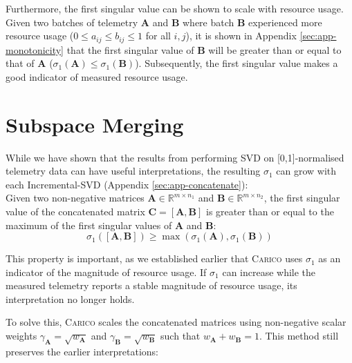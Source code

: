 Furthermore, the first singular value can be shown to scale with resource usage.
Given two batches of telemetry $\mathbf{A}$ and $\mathbf{B}$ where batch
$\mathbf{B}$ experienced more resource usage ($0 \leq a_{ij} \leq b_{ij} \leq 1$
for all $i,j$), it is shown in Appendix \ref{sec:app-monotonicity} that the
first singular value of $\mathbf{B}$ will be greater than or equal to that of
$\mathbf{A}$ ($\sigma_1(\mathbf{A}) \leq \sigma_1(\mathbf{B})$). Subsequently,
the first singular value makes a good indicator of measured resource usage.

\section{Subspace Merging}
\label{sec:local-merge}
While we have shown that the results from performing SVD on [0,1]-normalised
telemetry data can have useful interpretations, the resulting $\sigma_1$ can
grow with each Incremental-SVD (Appendix \ref{sec:app-concatenate}):\\
Given two non-negative matrices $\mathbf{A} \in \mathbb{R}^{m \times n_1}$ and
$\mathbf{B} \in \mathbb{R}^{m \times n_2}$, the first singular value of the
concatenated matrix $\mathbf{C} = [\mathbf{A}, \mathbf{B}]$ is greater than or
equal to the maximum of the first singular values of $\mathbf{A}$ and
$\mathbf{B}$:
\[ \sigma_1([\mathbf{A}, \mathbf{B}]) \geq \max(\sigma_1(\mathbf{A}),
\sigma_1(\mathbf{B})) \]

This property is important, as we established earlier that \textsc{Carico} uses
$\sigma_1$ as an indicator of the magnitude of resource usage. If $\sigma_1$ can
increase while the measured telemetry reports a stable magnitude of resource
usage, its interpretation no longer holds.

To solve this, \textsc{Carico} scales the concatenated matrices using non-negative scalar
weights $\gamma_{\mathbf{A}} = \sqrt{w_{\mathbf{A}}}$ and
$\gamma_{\mathbf{\mathbf{B}}} = \sqrt{w_{\mathbf{\mathbf{B}}}}$ such that
$w_{\mathbf{A}} + w_{\mathbf{\mathbf{B}}} = 1$. This method still preserves the
earlier interpretations:

